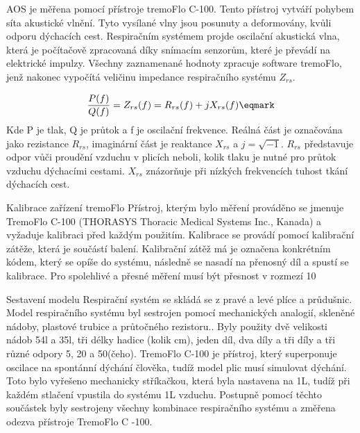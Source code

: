 AOS je měřena pomocí přístroje tremoFlo C-100. Tento přístroj vytváří pohybem síta akustické vlnění. Tyto vysílané vlny jsou posunuty a deformovány, kvůli odporu dýchacích cest. Respiračním systémem projde oscilační akustická vlna, která je počítačově zpracovaná díky snímacím senzorům, které je převádí na elektrické impulzy. Všechny zaznamenané hodnoty zpracuje software tremoFlo, jenž nakonec vypočítá veličinu impedance respiračního systému $Z_{rs}$. 

$$
  {P(f) \over Q(f)} = Z_{rs}(f) = R_{rs}(f) + j X_{rs}(f) \eqmark
$$
Kde P je tlak, Q je průtok a f je oscilační frekvence. 
Reálná část je označována jako rezistance $R_{rs}$, imaginární část je reaktance $X_{rs}$ a $j = \sqrt{-1}$. 
$R_{rs}$ představuje odpor vůči proudění vzduchu v plicích neboli, kolik tlaku je nutné pro průtok vzduchu dýchacími cestami. $X_{rs}$ znázorňuje při nízkých frekvencích tuhost tkání dýchacích cest. 

\sec Kalibrace zařízení tremoFlo 
Přístroj, kterým bylo měření prováděno se jmenuje TremoFlo C-100 (THORASYS Thoracic Medical Systems Inc., Kanada) a vyžaduje kalibraci před každým použitím. Kalibrace se provádí pomocí kalibrační zátěže, která je součástí balení. Kalibrační zátěž má je označena konkrétním kódem, který se opíše do systému, následně  se nasadí na přenosný díl a spustí se kalibrace. Pro spolehlivé a přesné měření musí být přesnost v rozmezí 10%

\sec Sestavení modelu 
Respirační systém se skládá se z pravé a levé plíce a průdušnic. Model respiračního systému  byl sestrojen pomocí mechanických analogií, skleněné nádoby, plastové trubice a průtočného rezistoru..  Byly použity dvě velikosti nádob 54l a 35l, tři délky hadice (kolik cm), jeden díl, dva díly a tři díly a tři různé odpory 5, 20 a 50(čeho). 
TremoFlo C-100 je přístroj, který superponuje oscilace na spontánní dýchání člověka, tudíž model plic musí simulovat dýchání. Toto bylo vyřešeno mechanicky stříkačkou, která byla nastavena na 1L, tudíž při každém stlačení vpustila do systému 1L vzduchu. 
Postupně pomocí těchto součástek byly sestrojeny všechny kombinace respiračního systému a změřena odezva přístroje TremoFlo C -100.

